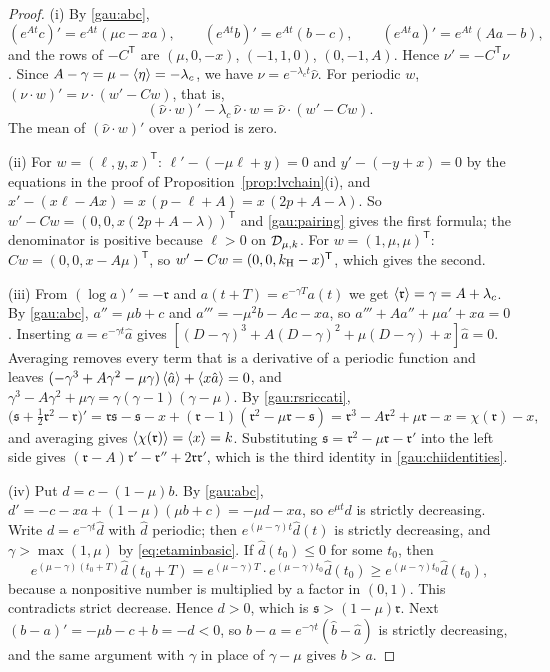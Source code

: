 \begin{proof}
(i) By \eqref{gau:abc},
\[
(e^{At}c)'=e^{At}(\mu c-xa),\qquad(e^{At}b)'=e^{At}(b-c),\qquad(e^{At}a)'=e^{At}(Aa-b),
\]
and the rows of $-C^{\mathsf T}$ are $(\mu,0,-x)$, $(-1,1,0)$, $(0,-1,A)$. Hence $\nu'=-C^{\mathsf T}\nu$. Since $A-\gamma=\mu-\left\langle \eta\right\rangle=-\lambda_c$, we have $\nu=e^{-\lambda_ct}\hat\nu$. For periodic $w$, $(\nu\cdot w)'=\nu\cdot(w'-Cw)$, that is,
\[
(\hat\nu\cdot w)'-\lambda_c\,\hat\nu\cdot w=\hat\nu\cdot(w'-Cw).
\]
The mean of $(\hat\nu\cdot w)'$ over a period is zero.

(ii) For $w=(\ell,y,x)^{\mathsf T}$: $\ell'-(-\mu\ell+y)=0$ and $y'-(-y+x)=0$ by the equations in the proof of Proposition~\ref{prop:lvchain}(i), and $x'-(x\ell-Ax)=x\,(p-\ell+A)=x\,(2p+A-\lambda)$. So $w'-Cw=(0,0,x(2p+A-\lambda))^{\mathsf T}$ and \eqref{gau:pairing} gives the first formula; the denominator is positive because $\ell>0$ on $\mathcal D_{\mu,k}$. For $w=(1,\mu,\mu)^{\mathsf T}$: $Cw=(0,0,x-A\mu)^{\mathsf T}$, so $w'-Cw=(0,0,k_{\mathrm H}-x)^{\mathsf T}$, which gives the second.

(iii) From $(\log a)'=-\mathfrak r$ and $a(t+T)=e^{-\gamma T}a(t)$ we get $\left\langle \mathfrak r\right\rangle=\gamma=A+\lambda_c$. By \eqref{gau:abc}, $a''=\mu b+c$ and $a'''=-\mu^2b-Ac-xa$, so $a'''+Aa''+\mu a'+xa=0$. Inserting $a=e^{-\gamma t}\hat a$ gives $[(D-\gamma)^3+A(D-\gamma)^2+\mu(D-\gamma)+x]\hat a=0$. Averaging removes every term that is a derivative of a periodic function and leaves $(-\gamma^3+A\gamma^2-\mu\gamma)\left\langle \hat a\right\rangle+\left\langle x\hat a\right\rangle=0$, and $\gamma^3-A\gamma^2+\mu\gamma=\gamma(\gamma-1)(\gamma-\mu)$. By \eqref{gau:rsriccati},
\[
\bigl(\mathfrak s+\tfrac12\mathfrak r^2-\mathfrak r\bigr)'=\mathfrak r\mathfrak s-\mathfrak s-x+(\mathfrak r-1)(\mathfrak r^2-\mu\mathfrak r-\mathfrak s)=\mathfrak r^3-A\mathfrak r^2+\mu\mathfrak r-x=\chi(\mathfrak r)-x ,
\]
and averaging gives $\left\langle \chi(\mathfrak r)\right\rangle=\left\langle x\right\rangle=k$. Substituting $\mathfrak s=\mathfrak r^2-\mu\mathfrak r-\mathfrak r'$ into the left side gives $(\mathfrak r-A)\mathfrak r'-\mathfrak r''+2\mathfrak r\mathfrak r'$, which is the third identity in \eqref{gau:chiidentities}.

(iv) Put $d=c-(1-\mu)b$. By \eqref{gau:abc}, $d'=-c-xa+(1-\mu)(\mu b+c)=-\mu d-xa$, so $e^{\mu t}d$ is strictly decreasing. Write $d=e^{-\gamma t}\hat d$ with $\hat d$ periodic; then $e^{(\mu-\gamma)t}\hat d(t)$ is strictly decreasing, and $\gamma>\max(1,\mu)$ by \eqref{eq:etaminbasic}. If $\hat d(t_0)\le0$ for some $t_0$, then
\[
e^{(\mu-\gamma)(t_0+T)}\hat d(t_0+T)=e^{(\mu-\gamma)T}\cdot e^{(\mu-\gamma)t_0}\hat d(t_0)\ge e^{(\mu-\gamma)t_0}\hat d(t_0),
\]
because a nonpositive number is multiplied by a factor in $(0,1)$. This contradicts strict decrease. Hence $d>0$, which is $\mathfrak s>(1-\mu)\mathfrak r$. Next $(b-a)'=-\mu b-c+b=-d<0$, so $b-a=e^{-\gamma t}(\hat b-\hat a)$ is strictly decreasing, and the same argument with $\gamma$ in place of $\gamma-\mu$ gives $b>a$.


\end{proof}

